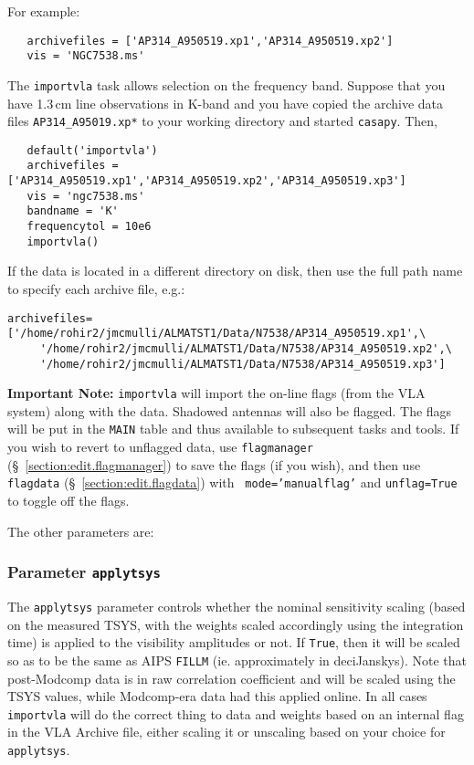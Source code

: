 For example:
\small
\begin{verbatim}
   archivefiles = ['AP314_A950519.xp1','AP314_A950519.xp2']
   vis = 'NGC7538.ms'
\end{verbatim}
\normalsize

The {\tt importvla} task allows selection on the frequency band.
Suppose that you have 1.3\,cm line observations in K-band and you
have copied the archive data files {\tt AP314\_A95019.xp*} to your 
working directory and started {\tt casapy}.  Then,
\small
\begin{verbatim}
   default('importvla')
   archivefiles = ['AP314_A950519.xp1','AP314_A950519.xp2','AP314_A950519.xp3']
   vis = 'ngc7538.ms' 
   bandname = 'K' 
   frequencytol = 10e6
   importvla()
\end{verbatim}
\normalsize
If the data is located in a different directory on disk, then use the
full path name to specify each archive file, e.g.:
\small
\begin{verbatim}
archivefiles=['/home/rohir2/jmcmulli/ALMATST1/Data/N7538/AP314_A950519.xp1',\
     '/home/rohir2/jmcmulli/ALMATST1/Data/N7538/AP314_A950519.xp2',\
     '/home/rohir2/jmcmulli/ALMATST1/Data/N7538/AP314_A950519.xp3']
\end{verbatim}
\normalsize

{\bf Important Note:} {\tt importvla} will import the on-line flags
(from the VLA system) along with the data. Shadowed antennas will also
be flagged. The flags will be put in the {\tt MAIN} table and thus
available to subsequent tasks and tools.  If you wish to revert to
unflagged data, use {\tt flagmanager}
(\S~\ref{section:edit.flagmanager}) to save the flags (if you wish),
and then use {\tt flagdata} (\S~\ref{section:edit.flagdata}) with {\tt
  mode='manualflag'} and {\tt unflag=True} to toggle off the flags.

The other parameters are:

\subsubsection{Parameter {\tt applytsys} }
\label{section:io.import.vla.applytsys}

The {\tt applytsys} parameter controls whether the nominal sensitivity
scaling (based on the measured TSYS, with the weights scaled
accordingly using the integration time) is
applied to the visibility amplitudes or not.  If {\tt True}, then it
will be scaled so as to be the same as AIPS {\tt FILLM}
(ie. approximately in deciJanskys).
Note that post-Modcomp data is in raw correlation coefficient and will
be scaled using the TSYS values, while Modcomp-era data had this
applied online.  
In all cases {\tt importvla} will do
the correct thing to data and weights based on an internal flag in the
VLA Archive file, either scaling it or unscaling based on your choice
for {\tt applytsys}.

